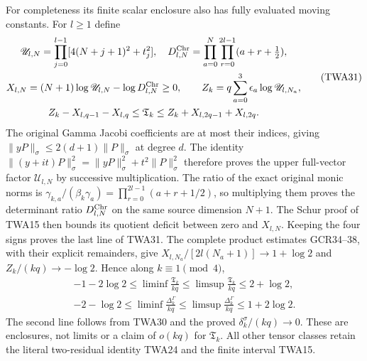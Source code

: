 For completeness its finite scalar enclosure also has
fully evaluated moving constants. For $l\geq1$ define
\[
\begin{gathered}
 \mathscr U_{l,N}=\prod_{j=0}^{l-1}[4(N+j+1)^2+t_j^2],
 \quad D_{l,N}^{\rm Chr}
   =\prod_{a=0}^{N}\prod_{r=0}^{2l-1}(a+r+\tfrac12),\\
 X_{l,N}=(N+1)\log\mathscr U_{l,N}-\log D_{l,N}^{\rm Chr}\geq0,
 \qquad Z_k=q\sum_{a=0}^3\epsilon_a\log\mathscr U_{l,N_a},\\
 Z_k-X_{l,q-1}-X_{l,q}\leq\mathfrak T_k
       \leq Z_k+X_{l,2q-1}+X_{l,2q}.
\end{gathered}\tag{TWA31}
\]
The original Gamma Jacobi coefficients are at most their
indices, giving $\|yP\|_\sigma\leq2(d+1)\|P\|_\sigma$
at degree $d$. The identity
$\|(y+it)P\|_\sigma^2=\|yP\|_\sigma^2+t^2\|P\|_\sigma^2$
therefore proves the upper full-vector factor
$\mathscr U_{l,N}$ by successive multiplication.
The ratio of the exact original monic norms is
$\gamma_{k,a}/(\beta_k\gamma_a)
=\prod_{r=0}^{2l-1}(a+r+1/2)$, so multiplying them proves
the determinant ratio $D_{l,N}^{\rm Chr}$ on the same
source dimension $N+1$. The Schur proof of TWA15 then
bounds its quotient deficit between zero and $X_{l,N}$.
Keeping the four signs proves the last line of TWA31.
The complete product estimates GCR34--38, with their
explicit remainders, give
$X_{l,N_a}/[2l(N_a+1)]\to1+\log2$ and
$Z_k/(kq)\to-\log2$. Hence along $k\equiv1\pmod4$,
\[
\begin{gathered}
 -1-2\log2\leq\liminf\frac{\mathfrak T_k}{kq}
       \leq\limsup\frac{\mathfrak T_k}{kq}\leq2+\log2,\\
 -2-\log2\leq\liminf\frac{\Delta_k^\Gamma}{kq}
       \leq\limsup\frac{\Delta_k^\Gamma}{kq}\leq1+2\log2.
\end{gathered}\tag{TWA32}
\]
The second line follows from TWA30 and the proved
$\delta_k^\sigma/(kq)\to0$. These are enclosures, not
limits or a claim of $o(kq)$ for $\mathfrak T_k$.
All other tensor classes retain the literal two-residual
identity TWA24 and the finite interval TWA15.
